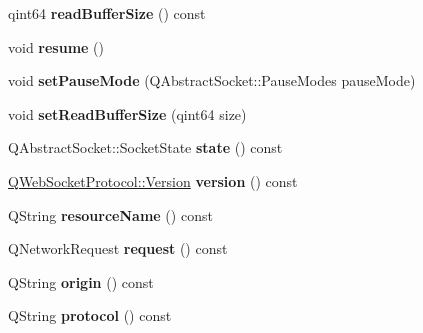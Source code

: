 \begin{DoxyCompactItemize}
\item 
\mbox{\label{class_q_web_socket_private_a25ecbdc01e469e592d52ec1e83a27729}} 
qint64 {\bfseries read\+Buffer\+Size} () const
\item 
\mbox{\label{class_q_web_socket_private_a9c4034dc61226a8c6cb37b06eecaeff2}} 
void {\bfseries resume} ()
\item 
\mbox{\label{class_q_web_socket_private_a7115ff1e51a24e6c5cea57f49a86a9ac}} 
void {\bfseries set\+Pause\+Mode} (Q\+Abstract\+Socket\+::\+Pause\+Modes pause\+Mode)
\item 
\mbox{\label{class_q_web_socket_private_ae224799d5eb63e0880ac0421ffd557b5}} 
void {\bfseries set\+Read\+Buffer\+Size} (qint64 size)
\item 
\mbox{\label{class_q_web_socket_private_a6934220c85eb36b288503a1d35a7078d}} 
Q\+Abstract\+Socket\+::\+Socket\+State {\bfseries state} () const
\item 
\mbox{\label{class_q_web_socket_private_a708dc332f560d959df59e8d86da0896d}} 
\mbox{\hyperlink{namespace_q_web_socket_protocol_ad53f2684577effe0a517eadb48714df3}{Q\+Web\+Socket\+Protocol\+::\+Version}} {\bfseries version} () const
\item 
\mbox{\label{class_q_web_socket_private_a95c17e35e0cf87c23c06acd88deb8188}} 
Q\+String {\bfseries resource\+Name} () const
\item 
\mbox{\label{class_q_web_socket_private_ad525e5293f063fc50353fd55e6b8d50f}} 
Q\+Network\+Request {\bfseries request} () const
\item 
\mbox{\label{class_q_web_socket_private_a01011373010a4b3e229805f7663319b1}} 
Q\+String {\bfseries origin} () const
\item 
\mbox{\label{class_q_web_socket_private_ad3c63d6fba7d2641cfc0ddcd0989de3a}} 
Q\+String {\bfseries protocol} () const
\item 

\end{DoxyCompactItemize}
